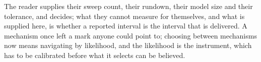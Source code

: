 The reader supplies their sweep count, their rundown, their model size and their tolerance, and decides; what they cannot measure for themselves, and what is supplied here, is whether a reported interval is the interval that is delivered. A mechanism once left a mark anyone could point to; choosing between mechanisms now means navigating by likelihood, and the likelihood is the instrument, which has to be calibrated before what it selects can be believed.
